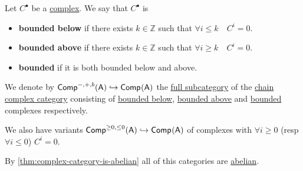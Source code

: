 \documentclass[../../../main]{subfiles}
\begin{document}
\begin{definition} \label{def:bounded-complexes}
  Let \(C^{\bullet}\) be a \hyperref[def:complex]{complex}. We say that \(C^{\bullet}\) is
  \begin{itemize}
    \item \textbf{bounded below} if there exists \(k \in \mathbb{Z}\) such that \(\forall i \leq k \quad C^{i} = 0\).
    \item \textbf{bounded above} if there exists \(k \in \mathbb{Z}\) such that \(\forall i \geq k \quad C^{i} = 0\).
    \item \textbf{bounded} if it is both bounded below and above.
  \end{itemize}
\end{definition}

\begin{notation}
  We denote by \(\Complex[-, +, b]{\category{A}} \hookrightarrow \Complex{\category{A}}\) the \hyperref[def:subcategory]{full subcategory} of the \hyperref[def:complex-category]{chain complex category} consisting of \hyperref[def:bounded-complexes]{bounded below}, \hyperref[def:bounded-complexes]{bounded above} and \hyperref[def:bounded-complexes]{bounded} complexes respectively.

  We also have variants \(\Complex[\geq 0, \leq 0]{\category{A}} \hookrightarrow \Complex{\category{A}}\) of complexes with \(\forall i \geq 0\) (resp \(\forall  i \leq 0\)) \(C^{i} = 0\).

  By \autoref{thm:complex-category-is-abelian} all of this categories are \hyperref[def:abelian-category]{abelian}.
\end{notation}
\end{document}
